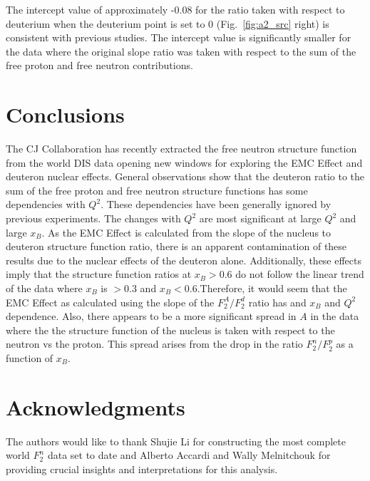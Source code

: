 \documentclass[oneside]{article}
\begin{document}
The intercept value of approximately -0.08 for the ratio taken with respect to deuterium when the deuterium point is set to 0 (Fig.~\ref{fig:a2_src} right) is consistent with previous studies. The intercept value is significantly smaller for the data where the original slope ratio was taken with respect to the sum of the free proton and free neutron contributions. 

\section{Conclusions}

The CJ Collaboration has recently extracted the free neutron structure function from the world DIS data opening new windows for exploring the EMC Effect and deuteron nuclear effects. General observations show that the deuteron ratio to the sum of the free proton and free neutron structure functions has some dependencies with $Q^2$. These dependencies have been generally ignored by previous experiments. The changes with $Q^2$ are most significant at large $Q^2$ and large $x_B$. As the EMC Effect is calculated from the slope of the nucleus to deuteron structure function ratio, there is an apparent contamination of these results due to the nuclear effects of the deuteron alone. Additionally, these effects imply that the structure function ratios at $x_B>0.6$ do not follow the linear trend of the data where $x_B$ is $>0.3$ and $x_B<0.6$.Therefore, it would seem that the EMC Effect as calculated using the slope of the $F_2^A/F_2^d$ ratio has and $x_B$ and $Q^2$ dependence. Also, there appears to be a more significant spread in $A$ in the data where the the structure function of the nucleus is taken with respect to the neutron vs the proton. This spread arises from the drop in the ratio $F_2^n/F_2^p$ as a function of $x_B$. 


\section{Acknowledgments}

The authors would like to thank Shujie Li for constructing the most complete world $F_2^n$ data set to date and Alberto Accardi and Wally Melnitchouk for providing crucial insights and interpretations for this analysis.  

\end{document}

